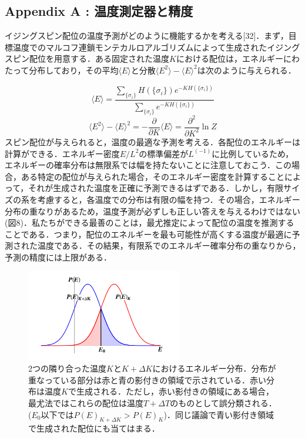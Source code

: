 \documentclass[a4paper,11pt]{jsarticle}
\begin{document}
\subsection*{Appendix A : 温度測定器と精度}
イジングスピン配位の温度予測がどのように機能するかを考える[32]．まず，目標温度でのマルコフ連鎖モンテカルロアルゴリズムによって生成されたイジングスピン配位を用意する．ある固定された温度$K$における配位は，エネルギーにわたって分布しており，その平均$\langle E \rangle$と分散$\langle E^2 \rangle - \langle E \rangle^2$は次のように与えられる．\par
\begin{equation}
  \langle E \rangle = \frac{\sum_{\{ \sigma_i \}}H(\{ \sigma_i \})e^{-KH(\{ \sigma_i \})}}{\sum_{\{ \sigma_i \}}e^{-KH(\{ \sigma_i \})}}
\end{equation}
\begin{equation}
  \langle E^2 \rangle - \langle E \rangle^2
  = -\frac{\partial}{\partial K}\langle E \rangle
  = \frac{\partial^2}{\partial K^2} \ln{Z}
\end{equation}
スピン配位が与えられると，温度の最適な予測を考える．各配位のエネルギーは計算ができる．エネルギー密度$E/L^2$の標準偏差が$L^(-1)$に比例しているため，エネルギーの確率分布は無限系では幅を持たないことに注意しておこう．この場合，ある特定の配位が与えられた場合，そのエネルギー密度を計算することによって，それが生成された温度を正確に予測できるはずである．しかし，有限サイズの系を考慮すると，各温度での分布は有限の幅を持つ．その場合，エネルギー分布の重なりがあるため，温度予測が必ずしも正しい答えを与えるわけではない(図8)．私たちができる最善のことは，最尤推定によって配位の温度を推測することである．つまり，配位のエネルギーを最も可能性が高くする温度が最適に予測された温度である．その結果，有限系でのエネルギー確率分布の重なりから，予測の精度には上限がある．\par
\begin{figure}
  \begin{center}
    \includegraphics[height=4cm]{image/Figure8.png}
    \caption{2つの隣り合った温度$K$と$K+\Delta K$におけるエネルギー分布．分布が重なっている部分は赤と青の影付きの領域で示されている．赤い分布は温度$K$で生成される．ただし，赤い影付きの領域にある場合，最尤法ではこれらの配位は温度$T+\Delta T$のものとして誤分類される．($E_0$以下では$P(E)_{K+ \Delta K} > P(E)_K$)．同じ議論で青い影付き領域で生成された配位にも当てはまる．}
  \end{center}
\end{figure}
\end{document}
